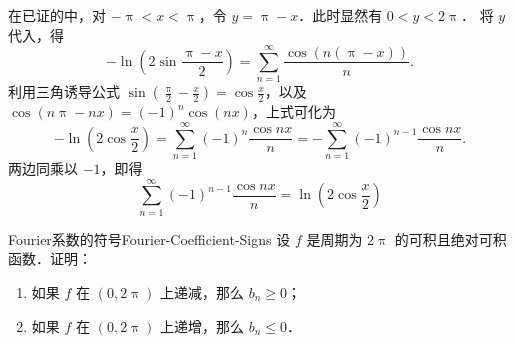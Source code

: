 \begin{myproof}

    在已证的中，对 $-\uppi < x < \uppi$，令 $y = \uppi - x$．此时显然有 $0 < y < 2\uppi$．
    将 $y$ 代入，得
    \begin{equation}\label{eq:sub-step}
        -\ln \left( 2\sin \frac{\uppi - x}{2} \right) = \sum_{n=1}^{\infty} \frac{\cos(n(\uppi - x))}{n}.
    \end{equation}
    利用三角诱导公式 $\sin\left(\frac{\uppi}{2} - \frac{x}{2}\right) = \cos \frac{x}{2}$，以及 $\cos(n\uppi - nx) = (-1)^n \cos(nx)$，上式可化为
    \begin{equation}\label{eq:sub-simplify}
        -\ln \left( 2\cos \frac{x}{2} \right) = \sum_{n=1}^{\infty} (-1)^n \frac{\cos nx}{n} = - \sum_{n=1}^{\infty} (-1)^{n-1} \frac{\cos nx}{n}.
    \end{equation}
    两边同乘以 $-1$，即得
    \begin{equation}
        \boxed{\sum_{n=1}^{\infty} (-1)^{n-1} \frac{\cos nx}{n} = \ln \left( 2\cos \frac{x}{2} \right)}
    \end{equation}
\end{myproof}

\begin{problem}{Fourier系数的符号}{Fourier-Coefficient-Signs}
    设 $f$ 是周期为 $2\uppi$ 的可积且绝对可积函数．证明：
    \begin{enumerate}
        \item 如果 $f$ 在 $(0, 2\uppi)$ 上递减，那么 $b_n \geqslant 0$；
        \item 如果 $f$ 在 $(0, 2\uppi)$ 上递增，那么 $b_n \leqslant 0$．
    \end{enumerate}
\end{problem}

